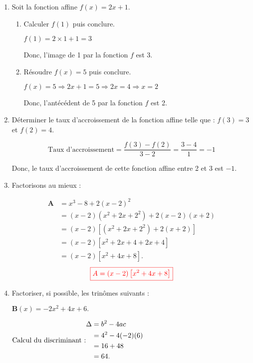 \documentclass[12pt,a4paper]{article}
\begin{document}
\begin{enumerate}
    \item Soit la fonction affine \( f(x) = 2x + 1 \).
    \begin{enumerate}
        \item Calculer \( f(1) \) puis conclure.

        \(f(1) = 2 \times 1 + 1 = 3\)

        Donc, l'image de 1 par la fonction \( f \) est 3.

        \item Résoudre \( f(x) = 5 \) puis conclure.

 \(        f(x) = 5 \Rightarrow 2x + 1 = 5 \Rightarrow 2x = 4 \Rightarrow x = 2\)

        Donc, l'antécédent de 5 par la fonction \( f \) est 2.
    \end{enumerate}

    \item Déterminer le taux d’accroissement de la fonction affine telle que : \( f(3)=3 \) et \( f(2)=4 \).

    \[
    \text{Taux d'accroissement} = \frac{f(3) - f(2)}{3 - 2} = \frac{3 - 4}{1} = -1
    \]

    Donc, le taux d’accroissement de cette fonction affine entre 2 et 3 est \( -1 \).
\item Factorisons au mieux :

\begin{align*}
\textbf{A} &= x^3 - 8 + 2(x - 2)^2 \\ 
  &= (x - 2)(x^2 + 2x + 2^2) + 2(x - 2)(x + 2) \\ 
  &= (x - 2)\left[(x^2 + 2x + 2^2) + 2(x + 2)\right] \\ 
  &= (x - 2)\left[x^2 + 2x + 4 + 2x + 4\right] \\ 
  &= (x - 2)\left[x^2 + 4x + 8\right].
\end{align*}
$$\textcolor{red}{\boxed{A=(x - 2)\left[x^2 + 4x + 8\right]}}$$

\item Factoriser, si possible, les trinômes suivants :

$
\textbf{B}(x) = -2x^2 + 4x + 6.
$

\(
\text{Calcul du discriminant :}\\
\begin{aligned}
\Delta &= b^2 - 4ac \\
       &= 4^2 - 4(-2)(6) \\
       &= 16 + 48 \\
       &= 64.
\end{aligned}
\)


\end{enumerate}
\end{document}
